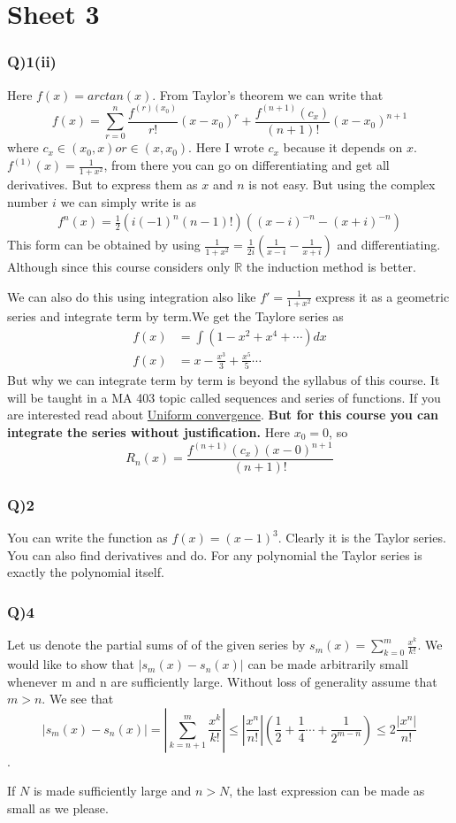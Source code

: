 \documentclass[11pt]{beamer}
\begin{document}
\section{Sheet 3}
\begin{frame}
\frametitle{Q)1(ii)}
Here $f(x)=arctan(x)$. From Taylor's theorem we can write that
$$f(x)=\sum_{r=0}^{n}\dfrac{f^{(r)(x_0)}}{r!}(x-x_0)^{r}+\dfrac{f^{(n+1)}(c_x)}{(n+1)!}(x-x_0)^{n+1}$$
where $c_x\in (x_0,x) or \in (x,x_0)$. Here I wrote $c_x$ because it depends on $x$. $f^{(1)}(x)=\frac{1}{1+x^2}$, from there you can go on differentiating and get all derivatives. But to express them as $x$ and $n$ is not easy. But using the complex number $i$ we can simply write is as
\begin{align*}
f^{n}(x)=\frac{1}{2}(i(-1)^{n}(n-1)!)((x-i)^{-n}-(x+i)^{-n})
\end{align*}
This form can be obtained by using $\frac{1}{1+x^2}=\frac{1}{2i}(\frac{1}{x-i}-\frac{1}{x+i})$ and differentiating. Although since this course considers only $\mathbb{R}$ the induction method is better.
\end{frame}
\begin{frame}
We can also do this using integration also like $f'=\frac{1}{1+x^2}$ express it as a geometric series and integrate term by term.We get the Taylore series as
\begin{align*}
f(x)&=\int (1-x^2+x^4+\cdots )dx \\
f(x)&=x-\frac{x^3}{3}+\frac{x^5}{5}\cdots 
\end{align*}
But why we can integrate term by term is beyond the syllabus of this course. It will be taught in a MA 403 topic called sequences and series of functions. If you are interested read about \href{https://en.wikipedia.org/wiki/Uniform_convergence}{Uniform convergence}. \textbf{But for this course you can integrate the series without justification.} Here $x_0=0$, so
$$R_n(x)=\frac{f^{(n+1)}(c_x)(x-0)^{n+1}}{(n+1)!}$$
\end{frame}
\begin{frame}

\frametitle{Q)2}
You can write the function as $f(x)=(x-1)^3$. Clearly it is the Taylor series. You can also find derivatives and do. For any polynomial the Taylor series is exactly the polynomial itself.
\end{frame}
\begin{frame}
\frametitle{Q)4}
Let us denote the partial sums of of the given series by $s_m(x)=\sum_{k=0}^{m}\frac{x^k}{k!}$. We would like to show that $|s_m(x) - s_n(x)|$ can be made arbitrarily small whenever m and n are sufficiently large. Without loss of generality assume that $m>n$. We see that
$$|s_m(x) -s_n(x)|=|\sum_{k=n+1}^{m}\frac{x^k}{k!}|\leq |\frac{x^n}{n!}|\left(\frac{1}{2}+\frac{1}{4}\cdots +\frac{1}{2^{m-n}}\right)\leq 2\frac{|x^n|}{n!}$$.

If $N$ is made sufficiently large and $n > N$, the last expression can be made as small as we please.
\end{frame}
\end{document}
